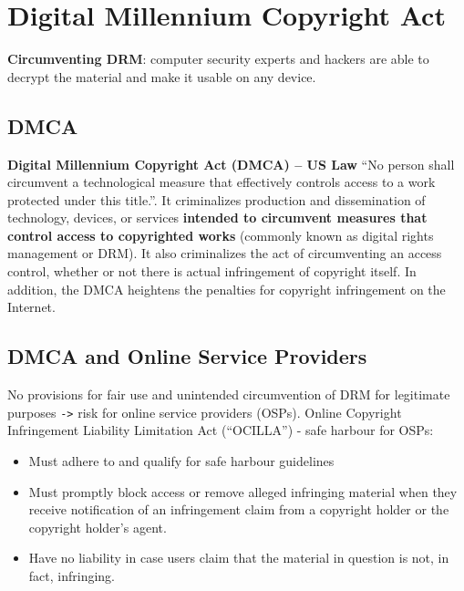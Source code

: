\documentclass{article}
\begin{document}
\section{Digital Millennium Copyright Act}
\begin{flushleft}
\textbf{Circumventing DRM}: computer security experts and hackers are able to decrypt the material and make it usable on any device.
\end{flushleft}

\subsection{DMCA}

\begin{flushleft}
\textbf{Digital Millennium Copyright Act (DMCA) – US Law} “No person shall circumvent a technological measure that effectively controls access to a work protected under this title.”. It criminalizes production and dissemination of technology, devices, or services \textbf{intended to circumvent measures that control access to copyrighted works} (commonly known as digital rights management or DRM). It also criminalizes the act of circumventing an access control, whether or not there is actual infringement of copyright itself. In addition, the DMCA heightens the penalties for copyright infringement on the Internet.
\end{flushleft}

\subsection{DMCA and Online Service Providers}

\begin{flushleft}
No provisions for fair use and unintended circumvention of DRM for legitimate purposes \verb|->| risk for online service providers (OSPs). Online Copyright Infringement Liability Limitation Act (“OCILLA”) - safe harbour for OSPs:
\begin{itemize}
  \item Must adhere to and qualify for safe harbour guidelines
  \item Must promptly block access or remove alleged infringing material when they receive notification of an infringement claim from a copyright holder or the copyright holder's agent.
  \item Have no liability in case users claim that the material in question is not, in fact, infringing.
\end{itemize}
\end{flushleft}
\end{document}
